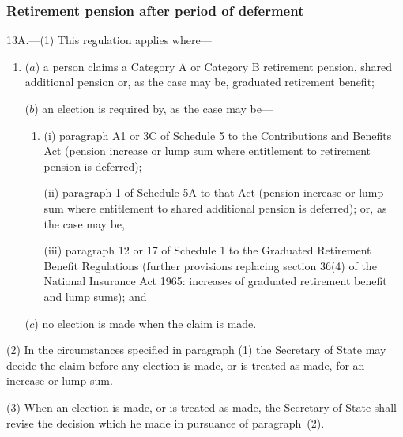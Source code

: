 \documentclass[12pt,a4paper]{article}
\begin{document}

\subsubsection[13A. Retirement pension after period of deferment]{Retirement pension after period of deferment}

13A.---(1)  This regulation applies where—
\begin{enumerate}\item[]
($a$) a person claims a Category A or Category B retirement pension, shared additional pension or, as the case may be, graduated retirement benefit;

($b$) an election is required by, as the case may be—
\begin{enumerate}\item[]
(i) paragraph A1 or 3C of Schedule 5 to the Contributions and Benefits Act (pension increase or lump sum where entitlement to retirement pension is deferred);

(ii) paragraph 1 of Schedule 5A to that Act (pension increase or lump sum where entitlement to shared additional pension is deferred); or, as the case may be,

(iii) paragraph 12 or 17 of Schedule 1 to the Graduated Retirement Benefit Regulations (further provisions replacing section 36(4) of the National Insurance Act 1965: increases of graduated retirement benefit and lump sums); and 
\end{enumerate}

($c$) no election is made when the claim is made.
\end{enumerate}

(2) In the circumstances specified in paragraph (1) the Secretary of State may decide the claim before any election is made, or is treated as made, for an increase or lump sum.

(3) When an election is made, or is treated as made, the Secretary of State shall revise the decision which he made in pursuance of paragraph~(2).
\end{document}
